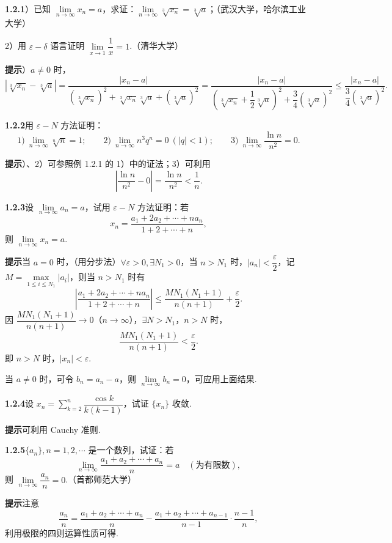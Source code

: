 \documentclass[UTF8, 12pt, fontset=fandol, oneside]{ctexart}
\begin{document}
\noindent\textbf{1.2.1}）已知 $\lim\limits_{n\to\infty}x_n=a$，求证：$\lim\limits_{n\to\infty}\sqrt[3]{x_n}=\sqrt[3]{a}$；（武汉大学，哈尔滨工业大学）

2）用 $\varepsilon-\delta$ 语言证明 $\lim\limits_{x\to1}\dfrac1x=1$.（清华大学）

\noindent\textbf{提示}）$a\ne0$ 时，
\[
\left|\sqrt[3]{x_n}-\sqrt[3]{a}\right|
=\frac{|x_n-a|}
{(\sqrt[3]{x_n})^2+\sqrt[3]{x_n}\sqrt[3]{a}+(\sqrt[3]{a})^2}
=\frac{|x_n-a|}
{\left(\sqrt[3]{x_n}+\dfrac12\sqrt[3]{a}\right)^2
+\dfrac34(\sqrt[3]{a})^2}
\le \frac{|x_n-a|}{\dfrac34(\sqrt[3]{a})^2}.
\]

\noindent\textbf{1.2.2}\quad 用 $\varepsilon-N$ 方法证明：
\[
1)\ \lim_{n\to\infty}\sqrt[n]{n}=1;\qquad
2)\ \lim_{n\to\infty}n^3q^n=0\ (|q|<1);\qquad
3)\ \lim_{n\to\infty}\frac{\ln n}{n^2}=0.
\]

\noindent\textbf{提示}）、2）可参照例 1.2.1 的 1）中的证法；3）可利用
\[
\left|\frac{\ln n}{n^2}-0\right|=\frac{\ln n}{n^2}<\frac1n.
\]

\noindent\textbf{1.2.3}\quad 设 $\lim\limits_{n\to\infty}a_n=a$，试用 $\varepsilon-N$ 方法证明：若
\[
  x_n=\frac{a_1+2a_2+\cdots+na_n}{1+2+\cdots+n},
\]
则 $\lim\limits_{n\to\infty}x_n=a$.

\noindent\textbf{提示}\quad 当 $a=0$ 时，（用分步法）$\forall\varepsilon>0,\exists N_1>0$，当 $n>N_1$ 时，$|a_n|<\dfrac{\varepsilon}{2}$，记 $M=\max\limits_{1\le i\le N_1}|a_i|$，则当 $n>N_1$ 时有
\[
\left|\frac{a_1+2a_2+\cdots+na_n}{1+2+\cdots+n}\right|
\le \frac{MN_1(N_1+1)}{n(n+1)}+\frac{\varepsilon}{2}.
\]
因 $\dfrac{MN_1(N_1+1)}{n(n+1)}\to0$（$n\to\infty$），$\exists N>N_1$，$n>N$ 时，
\[
  \frac{MN_1(N_1+1)}{n(n+1)}<\frac{\varepsilon}{2}.
\]
即 $n>N$ 时，$|x_n|<\varepsilon$.

当 $a\ne0$ 时，可令 $b_n=a_n-a$，则 $\lim\limits_{n\to\infty}b_n=0$，可应用上面结果.

\noindent\textbf{1.2.4}\quad 设 $x_n=\sum\limits_{k=2}^n\dfrac{\cos k}{k(k-1)}$，试证 $\{x_n\}$ 收敛.

\noindent\textbf{提示}\quad 可利用 Cauchy 准则.

\noindent\textbf{1.2.5}\quad $\{a_n\},n=1,2,\cdots$ 是一个数列，试证：若
\[
  \lim_{n\to\infty}\frac{a_1+a_2+\cdots+a_n}{n}=a\quad(\text{为有限数}),
\]
则 $\lim\limits_{n\to\infty}\dfrac{a_n}{n}=0$.（首都师范大学）

\noindent\textbf{提示}\quad 注意
\[
  \frac{a_n}{n}
  =\frac{a_1+a_2+\cdots+a_n}{n}
  -\frac{a_1+a_2+\cdots+a_{n-1}}{n-1}\cdot\frac{n-1}{n},
\]
利用极限的四则运算性质可得.
\end{document}
